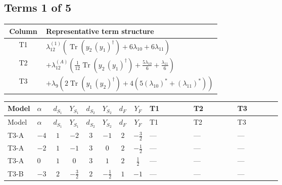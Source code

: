 \documentclass[8pt]{article}
\begin{document}
\begin{landscape}
\subsection*{Terms 1 of 5}
\begin{center}
\begin{tabular}{@{}c >{\raggedright\arraybackslash}p{0.82\linewidth}@{}}
\toprule
Column & Representative term structure \\
\midrule
T1 & \(\displaystyle {\lambda_{12}^{(1)}} (\operatorname{Tr}\!\left({y_2}\,\left({y_1}\right)^{\dagger}\right)+6 {\lambda_{10}}+6 {\lambda_{11}})\) \\
\midrule
T2 & \(\displaystyle +{\lambda_{12}^{(A)}} \left(\frac{1}{12} \operatorname{Tr}\!\left({y_2}\,\left({y_1}\right)^{\dagger}\right)+\frac{5 {\lambda_{10}}}{6}+\frac{{\lambda_{11}}}{6}\right)\) \\
\midrule
T3 & \(\displaystyle +{\lambda_{9}} (2 \operatorname{Tr}\!\left({y_1}\,\left({y_2}\right)^{\dagger}\right)+4 (5 \left({\lambda_{10}}\right)^{*}+\left({\lambda_{11}}\right)^{*}))\) \\
\midrule
\bottomrule
\end{tabular}
\end{center}
\smallskip
\tiny
\begin{longtable}{@{}llcccccc >{\raggedright\arraybackslash}p{0.21\linewidth} >{\raggedright\arraybackslash}p{0.21\linewidth} >{\raggedright\arraybackslash}p{0.21\linewidth}@{}}
\toprule
Model & $\alpha$ & $d_{S_1}$ & $Y_{S_1}$ & $d_{S_2}$ & $Y_{S_2}$ & $d_F$ & $Y_F$ & T1 & T2 & T3 \\
\midrule
\endfirsthead
\toprule
Model & $\alpha$ & $d_{S_1}$ & $Y_{S_1}$ & $d_{S_2}$ & $Y_{S_2}$ & $d_F$ & $Y_F$ & T1 & T2 & T3 \\
\midrule
\endhead
T3-A & $-4$ & $1$ & $-2$ & $3$ & $-1$ & $2$ & $-\frac{3}{2}$ & --- & --- & --- \\
\midrule
T3-A & $-2$ & $1$ & $-1$ & $3$ & $0$ & $2$ & $-\frac{1}{2}$ & --- & --- & --- \\
\midrule
T3-A & $0$ & $1$ & $0$ & $3$ & $1$ & $2$ & $\frac{1}{2}$ & --- & --- & --- \\
\midrule
T3-B & $-3$ & $2$ & $-\frac{3}{2}$ & $2$ & $-\frac{1}{2}$ & $1$ & $-1$ & --- & --- & --- \\
\midrule

\end{longtable}
\end{landscape}
\end{document}
